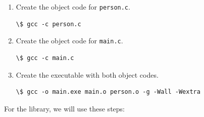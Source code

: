\documentclass[a4paper]{article}
\begin{document}
\noindent
\begin{minipage}[H]{\linewidth}
\begin{enumerate}
\item Create the object code for \verb!person.c!.

\noindent
\begin{minipage}[H]{\linewidth}
\mbox{}
\begin{lstlisting}[style=terminalStyle]
\$ gcc -c person.c
\end{lstlisting}
\end{minipage}
\item Create the object code for \verb!main.c!.

\noindent
\begin{minipage}[H]{\linewidth}
\mbox{}
\begin{lstlisting}[style=terminalStyle]
\$ gcc -c main.c
\end{lstlisting}
\end{minipage}
\item Create the executable with both object codes.

\noindent
\begin{minipage}[H]{\linewidth}
\mbox{}
\begin{lstlisting}[style=terminalStyle]
\$ gcc -o main.exe main.o person.o -g -Wall -Wextra
\end{lstlisting}
\end{minipage}
\end{enumerate}
\end{minipage}

For the library, we will use these steps:
\end{document}
